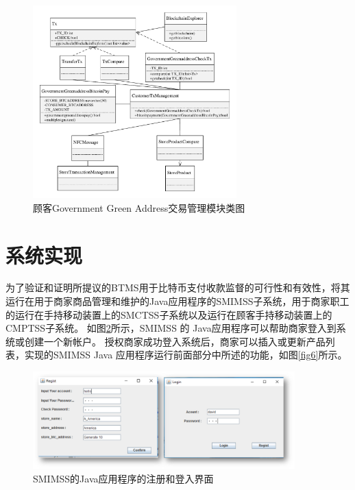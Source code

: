 	\begin{figure}[!htbp]
		\centering
		\includegraphics[width = 0.7\textwidth]{c6.pdf}
		\caption{顾客Government Green Address交易管理模块类图}\label{c6}
	\end{figure}

\section{系统实现}


为了验证和证明所提议的BTMS用于比特币支付收款监督的可行性和有效性，将其运行在用于商家商品管理和维护的Java应用程序的SMIMSS子系统，用于商家职工的运行在手持移动装置上的SMCTSS子系统以及运行在顾客手持移动装置上的CMPTSS子系统。
如图\ref{fig5}所示，SMIMSS 的 Java应用程序可以帮助商家登入到系统或创建一个新帐户。 授权商家成功登⼊系统后，商家可以插⼊或更新产品列表，实现的SMIMSS Java 应⽤程序运⾏前⾯部分中所述的功能，如图\ref{fig6}所示。

\begin{figure}[!htbp]
	\centering
	\includegraphics[width = 0.9\textwidth]{fig5.png}
	\caption{SMIMSS的Java应用程序的注册和登入界面}\label{fig5}
\end{figure}

